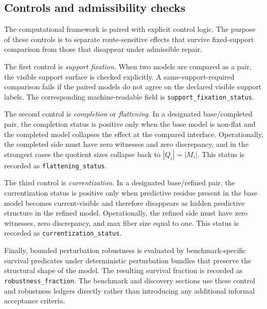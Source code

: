 \documentclass[11pt]{article}
\newcommand{\CurrentQ}{Q}
\newcommand{\PredictiveQ}{M}
\theoremstyle{definition}
\begin{document}
\subsection{Controls and admissibility checks}\label{subsec:eff-controls}
The computational framework is paired with explicit control logic. The purpose of these controls is to separate route-sensitive effects that survive fixed-support comparison from those that disappear under admissible repair.

The first control is \emph{support fixation}. When two models are compared as a pair, the visible support surface is checked explicitly. A same-support-required comparison fails if the paired models do not agree on the declared visible support labels. The corresponding machine-readable field is \texttt{support\_fixation\_status}.

The second control is \emph{completion} or \emph{flattening}. In a designated base/completed pair, the completion status is positive only when the base model is non-flat and the completed model collapses the effect at the compared interface. Operationally, the completed side must have zero witnesses and zero discrepancy, and in the strongest cases the quotient sizes collapse back to $|\CurrentQ_i|=|\PredictiveQ_i|$. This status is recorded as \texttt{flattening\_status}.

The third control is \emph{currentization}. In a designated base/refined pair, the currentization status is positive only when predictive residue present in the base model becomes current-visible and therefore disappears as hidden predictive structure in the refined model. Operationally, the refined side must have zero witnesses, zero discrepancy, and max fiber size equal to one. This status is recorded as \texttt{currentization\_status}.

Finally, bounded perturbation robustness is evaluated by benchmark-specific survival predicates under deterministic perturbation bundles that preserve the structural shape of the model. The resulting survival fraction is recorded as \texttt{robustness\_fraction}. The benchmark and discovery sections use these control and robustness ledgers directly rather than introducing any additional informal acceptance criteria.
\end{document}
